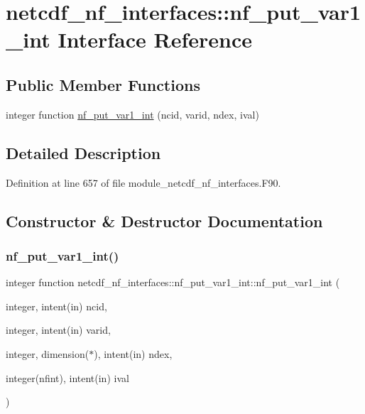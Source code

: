 \hypertarget{interfacenetcdf__nf__interfaces_1_1nf__put__var1__int}{}\section{netcdf\+\_\+nf\+\_\+interfaces\+:\+:nf\+\_\+put\+\_\+var1\+\_\+int Interface Reference}
\label{interfacenetcdf__nf__interfaces_1_1nf__put__var1__int}
\subsection*{Public Member Functions}
\begin{DoxyCompactItemize}
\item 
integer function \hyperlink{interfacenetcdf__nf__interfaces_1_1nf__put__var1__int_a5fe23a5fdddb2e8cef18e223f6d7c831}{nf\+\_\+put\+\_\+var1\+\_\+int} (ncid, varid, ndex, ival)
\end{DoxyCompactItemize}


\subsection{Detailed Description}


Definition at line 657 of file module\+\_\+netcdf\+\_\+nf\+\_\+interfaces.\+F90.



\subsection{Constructor \& Destructor Documentation}
\mbox{\label{interfacenetcdf__nf__interfaces_1_1nf__put__var1__int_a5fe23a5fdddb2e8cef18e223f6d7c831}} 
\subsubsection{\texorpdfstring{nf\+\_\+put\+\_\+var1\+\_\+int()}{nf\_put\_var1\_int()}}
{\footnotesize\ttfamily integer function netcdf\+\_\+nf\+\_\+interfaces\+::nf\+\_\+put\+\_\+var1\+\_\+int\+::nf\+\_\+put\+\_\+var1\+\_\+int (\begin{DoxyParamCaption}\item[{integer, intent(in)}]{ncid,  }\item[{integer, intent(in)}]{varid,  }\item[{integer, dimension($\ast$), intent(in)}]{ndex,  }\item[{integer(nfint), intent(in)}]{ival }\end{DoxyParamCaption})}



